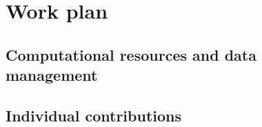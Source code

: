 \documentclass[11pt,final]{article}%
\begin{document}
\section{Work plan} 



\subsection{Computational resources and data management}



\subsection{Individual contributions}




\end{document}
